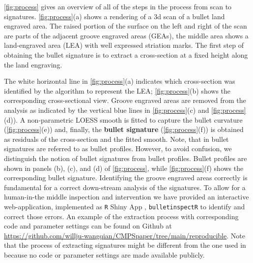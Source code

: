 \autoref{fig:process} gives an overview of all of the steps in the
process from scan to signatures. \autoref{fig:process}(a) shows a
rendering of a 3d scan of a bullet land engraved area. The raised
portion of the surface on the left and right of the scan are parts of
the adjacent groove engraved areas (GEAs), the middle area shows a
land-engraved area (LEA) with well expressed striation marks. The first
step of obtaining the bullet signature is to extract a cross-section at
a fixed height along the land engraving.

The white horizontal line in \autoref{fig:process}(a) indicates which
cross-section was identified by the algorithm to represent the LEA;
\autoref{fig:process}(b) shows the corresponding cross-sectional view.
Groove engraved areas are removed from the analysis as indicated by the
vertical blue lines in \autoref{fig:process}(c) and
\autoref{fig:process}(d)). A non-parametric LOESS smooth \citep{loess}
is fitted to capture the bullet curvature (\autoref{fig:process}(e))
and, finally, the \textbf{bullet signature} (\autoref{fig:process}(f))
is obtained as residuals of the cross-section and the fitted smooth.
Note, that in \citet{cmps} bullet signatures are referred to as bullet
profiles. However, to avoid confusion, we distinguish the notion of
bullet signatures from bullet profiles. Bullet profiles are shown in
panels (b), (c), and (d) of \autoref{fig:process}, while
\autoref{fig:process}(f) shows the corresponding bullet signature.
Identifying the groove engraved areas correctly is fundamental for a
correct down-stream analysis of the signatures. To allow for a
human-in-the middle inspection and intervention we have provided an
interactive web-application, implemented as \texttt{R} Shiny App
\citep{shiny}, \texttt{bulletinspectR} to identify and correct those
errors. An example of the extraction process with corresponding code and
parameter settings can be found on Github at
\url{https://github.com/willju-wangqian/CMPSpaper/tree/main/reproducible}.
Note that the process of extracting signatures might be different from
the one used in \citet{cmps} because no code or parameter settings are
made available publicly.

